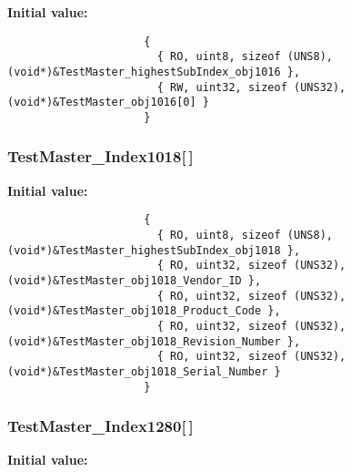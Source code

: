 \textbf{Initial value:}

\begin{Code}\begin{verbatim} 
                     {
                       { RO, uint8, sizeof (UNS8), (void*)&TestMaster_highestSubIndex_obj1016 },
                       { RW, uint32, sizeof (UNS32), (void*)&TestMaster_obj1016[0] }
                     }
\end{verbatim}\end{Code}
\subsubsection{ {\bf Test\-Master\_\-Index1018}[$\,$]}\label{TestMasterSlave_2TestMaster_8c_721e7ebe982831cd8575c9a7e33f9ec0}


\textbf{Initial value:}

\begin{Code}\begin{verbatim} 
                     {
                       { RO, uint8, sizeof (UNS8), (void*)&TestMaster_highestSubIndex_obj1018 },
                       { RO, uint32, sizeof (UNS32), (void*)&TestMaster_obj1018_Vendor_ID },
                       { RO, uint32, sizeof (UNS32), (void*)&TestMaster_obj1018_Product_Code },
                       { RO, uint32, sizeof (UNS32), (void*)&TestMaster_obj1018_Revision_Number },
                       { RO, uint32, sizeof (UNS32), (void*)&TestMaster_obj1018_Serial_Number }
                     }
\end{verbatim}\end{Code}
\subsubsection{ {\bf Test\-Master\_\-Index1280}[$\,$]}\label{TestMasterSlave_2TestMaster_8c_b09e72d1ae2e37cd027cf126f8e7e541}


\textbf{Initial value:}

